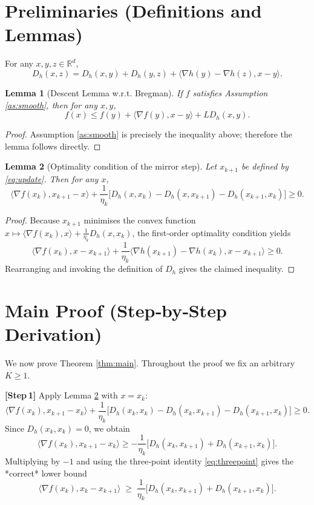\documentclass{article}
\newtheorem{lemma}{Lemma}
\newcommand{\ip}[2]{\langle #1,#2\rangle}
\newcommand{\grad}{\nabla}
\newcommand{\D}{D_{h}}
\newcommand{\R}{\mathbb{R}}
\begin{document}
\section*{Preliminaries (Definitions and Lemmas)}
\begin{definition}\label{def:threepoint}
For any $x,y,z\in\R^{d}$,
\begin{equation}
\label{eq:threepoint}
\D(x,z)=\D(x,y)+\D(y,z)+\ip{\grad h(y)-\grad h(z)}{x-y}.
\end{equation}
\end{definition}
\begin{lemma}[Descent Lemma w.r.t. Bregman]\label{lem:descent}
If $f$ satisfies Assumption \ref{as:smooth}, then for any $x,y$,
\[
f(x)\le f(y)+\ip{\grad f(y)}{x-y}+L\D(x,y).
\]
\end{lemma}
\begin{proof}
Assumption \ref{as:smooth} is precisely the inequality above; therefore the lemma follows directly. \hfill\qedsymbol
\end{proof}
\begin{lemma}[Optimality condition of the mirror step]\label{lem:opt}
Let $x_{k+1}$ be defined by \eqref{eq:update}. Then for any $x$,
\[
\ip{\grad f(x_k)}{x_{k+1}-x}+ \frac{1}{\eta_k}\bigl[\D(x,x_k)-\D(x,x_{k+1})-\D(x_{k+1},x_k)\bigr]\ge0.
\]
\end{lemma}
\begin{proof}
Because $x_{k+1}$ minimises the convex function $x\mapsto \ip{\grad f(x_k)}{x}+\frac{1}{\eta_k}\D(x,x_k)$, the first‑order optimality condition yields
\[
\ip{\grad f(x_k)}{x-x_{k+1}}+\frac{1}{\eta_k}\ip{\grad h(x_{k+1})-\grad h(x_k)}{x-x_{k+1}}\ge0.
\]
Rearranging and invoking the definition of $\D$ gives the claimed inequality. \hfill\qedsymbol
\end{proof}

\section*{Main Proof (Step‑by‑Step Derivation)}
We now prove Theorem \ref{thm:main}. Throughout the proof we fix an arbitrary $K\ge1$.

\bigskip
\noindent\textbf{[Step 1]} Apply Lemma \ref{lem:opt} with $x=x_k$:
\[
\ip{\grad f(x_k)}{x_{k+1}-x_k}+ \frac{1}{\eta_k}\bigl[\D(x_k,x_k)-\D(x_k,x_{k+1})-\D(x_{k+1},x_k)\bigr]\ge0.
\]
Since $\D(x_k,x_k)=0$, we obtain
\[
\ip{\grad f(x_k)}{x_{k+1}-x_k}\ge
-\frac{1}{\eta_k}\bigl[\D(x_k,x_{k+1})+\D(x_{k+1},x_k)\bigr].
\]
Multiplying by $-1$ and using the three‑point identity \eqref{eq:threepoint} gives the *correct* lower bound
\begin{equation}
\label{eq:step1}
\ip{\grad f(x_k)}{x_k-x_{k+1}}
\;\ge\;
\frac{1}{\eta_k}\bigl[\D(x_k,x_{k+1})+\D(x_{k+1},x_k)\bigr].
\end{equation}
\end{document}
